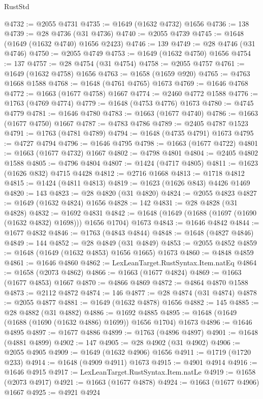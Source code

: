\begin{lexlean}{RustStd}
\begin{coremodule}
{\begin{coremodule}
{{{{{{{{{{{{{{{{{{{{{{{{{{{{{{{{{{{{{{{{{{{{@4732 := @2055 @4731
@4735 := @1649 (@1632 @4732) @1656
@4736 := 138
@4739 := @28 @4736 (@31 @4736)
@4740 := @2055 @4739
@4745 := @1648 (@1649 (@1632 @4740) @1656 @2423)
@4746 := 139
@4749 := @28 @4746 (@31 @4746)
@4750 := @2055 @4749
@4753 := @1649 (@1632 @4750) @1656
@4754 := 137
@4757 := @28 @4754 (@31 @4754)
@4758 := @2055 @4757
@4761 := @1649 (@1632 @4758) @1656
@4763 := @1658 (@1659 @920)
@4765 := @4763 @1668 @1588
@4768 := @1648 (@4761 @4765) @1673
@4769 := @1646 @4768
@4772 := @1663 (@1677 @4758) @1667
@4774 := @2460 @4772 @1588
@4776 := @1763 (@4769 @4774)
@4779 := @1648 (@4753 @4776) @1673
@4780 := @4745 @4779
@4781 := @1646 @4780
@4783 := @1663 (@1677 @4740)
@4786 := @1663 (@1677 @4750) @1667
@4787 := @4783 @4786
@4789 := @2405 @4787 @1523
@4791 := @1763 (@4781 @4789)
@4794 := @1648 (@4735 @4791) @1673
@4795 := @4727 @4794
@4796 := @1646 @4795
@4798 := @1663 (@1677 @4722)
@4801 := @1663 (@1677 @4732) @1667
@4802 := @4798 @4801
@4804 := @2405 @4802 @1588
@4805 := @4796 @4804
@4807 := @1424 (@4717 @4805)
@4811 := @1623 (@1626 @832) @4715 @4428
@4812 := @2716 @1668
@4813 := @1718 @4812
@4815 := @1424 (@4811 @4813)
@4819 := @1623 (@1626 @843) @4426 @1469
@4820 := 143
@4823 := @28 @4820 (@31 @4820)
@4824 := @2055 @4823
@4827 := @1649 (@1632 @4824) @1656
@4828 := 142
@4831 := @28 @4828 (@31 @4828)
@4832 := @1692 @4831
@4842 := @1648 (@1649 (@1688 (@1697 (@1690 (@1632 @4832) @1698))) @1656 @1704) @1673
@4843 := @1646 @4842
@4844 := @1677 @4832
@4846 := @1763 (@4843 @4844)
@4848 := @1648 (@4827 @4846)
@4849 := 144
@4852 := @28 @4849 (@31 @4849)
@4853 := @2055 @4852
@4859 := @1648 (@1649 (@1632 @4853) @1656 @1665) @1673
@4860 := @4848 @4859
@4861 := @1646 @4860
@4862 := LexLeanTarget.RustSyntax.Item.natEq
@4864 := @1658 (@2073 @4862)
@4866 := @1663 (@1677 @4824)
@4869 := @1663 (@1677 @4853) @1667
@4870 := @4866 @4869
@4872 := @4864 @4870 @1588
@4873 := @2112 @4872
@4874 := 146
@4877 := @28 @4874 (@31 @4874)
@4878 := @2055 @4877
@4881 := @1649 (@1632 @4878) @1656
@4882 := 145
@4885 := @28 @4882 (@31 @4882)
@4886 := @1692 @4885
@4895 := @1648 (@1649 (@1688 (@1690 (@1632 @4886) @1699)) @1656 @1704) @1673
@4896 := @1646 @4895
@4897 := @1677 @4886
@4899 := @1763 (@4896 @4897)
@4901 := @1648 (@4881 @4899)
@4902 := 147
@4905 := @28 @4902 (@31 @4902)
@4906 := @2055 @4905
@4909 := @1649 (@1632 @4906) @1656
@4911 := @1719 (@1720 @233)
@4914 := @1648 (@4909 @4911) @1673
@4915 := @4901 @4914
@4916 := @1646 @4915
@4917 := LexLeanTarget.RustSyntax.Item.natLe
@4919 := @1658 (@2073 @4917)
@4921 := @1663 (@1677 @4878)
@4924 := @1663 (@1677 @4906) @1667
@4925 := @4921 @4924
}}}}}}}}}}}}}}}}}}}}}}}}}}}}}}}}}}}}}}}}}}}}
\end{coremodule}}
\end{coremodule}
\end{lexlean}
